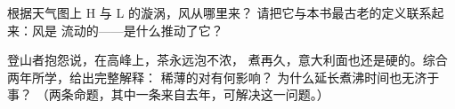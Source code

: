 \begin{exercise}[$\star\star$]\label{exo:g5:air-pressure-weather:10}
根据天气图上 H 与 L 的漩涡，风从哪里来？
请把它与本书最古老的定义联系起来：风是
流动的——是什么推动了它？
\end{exercise}

\begin{exercise}[$\star\star$]\label{exo:g5:air-pressure-weather:11}
登山者抱怨说，在高峰上，茶永远泡不浓，
煮再久，意大利面也还是硬的。综合两年所学，给出完整解释：
稀薄的对有何影响？
为什么延长煮沸时间也无济于事？
（两条命题，其中一条来自去年，可解决这一问题。）
\end{exercise}
